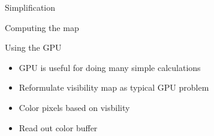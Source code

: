 \begin{frame}{Simplification}

\end{frame}

\begin{frame}{Computing the map}

\end{frame}

\begin{frame}{Using the GPU}
	\begin{itemize}
		\item GPU is useful for doing many simple calculations
		\item Reformulate visibility map as typical GPU problem
		\item Color pixels based on visbility
		\item Read out color buffer
	\end{itemize}
\end{frame}
